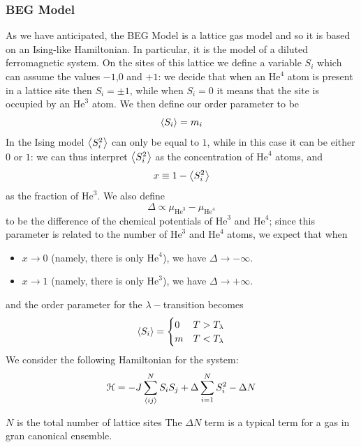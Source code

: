 \documentclass[../../Main/Main.tex]{subfiles}
\begin{document}
\subsubsection{BEG Model}
As we have anticipated, the BEG Model is a lattice gas model and so it is based on an Ising-like Hamiltonian. In particular, it is the model of a diluted ferromagnetic system.
On the sites of this lattice we define a variable \(S_i\) which can assume the values \(-1\),\(0\) and \(+1\): we decide that when an \( \text{He}^4 \) atom is present in a lattice site then  \(S_{i}=\pm 1\), while when \(S_{i}= 0\) it means that the site is occupied by an \( \text{He}^3 \) atom.
We then define our order parameter to be
\begin{equation*}
     \expval{S_i} = m_i 
\end{equation*}
In the Ising model  \( \expval{S_i^2}  \) can only be equal to \(1\), while in this case it can be either \(0\) or \(1\): we can thus interpret \( \expval{S_i^2}  \) as the concentration of \( \text{He}^4 \) atoms, and
\begin{equation*}
  x \equiv 1 - \expval{S_i^2}
\end{equation*}
 as the fraction of \( \text{He}^3 \).
 We also define 
\begin{equation*}
  \Delta \propto \mu _{\text{He}^3} - \mu _{\text{He}^4}
\end{equation*}
to be the difference of the chemical potentials of \( \text{He}^3 \) and \( \text{He}^4 \); since this parameter is related to the number of \( \text{He}^3 \) and \( \text{He}^4 \) atoms, we expect that when
\begin{itemize}
\item \( x \rightarrow 0\)  (namely, there is only \( \text{He}^4 \)), we have \( \Delta \rightarrow - \infty  \).
\item \( x \rightarrow 1\)  (namely, there is only \( \text{He}^3 \)), we have \( \Delta \rightarrow + \infty  \).
\end{itemize}
and the order parameter for the \( \lambda - \)transition becomes
\begin{equation*}
\expval{S_i} =
  \begin{cases}
   0 & T > T_{\lambda }\\
   m & T < T_{\lambda }
  \end{cases}
\end{equation*}
We consider the following Hamiltonian for the system:
\begin{equation}
\mathcal{H} = - J \sum_{\expval{ij} }^{N} S_i S_j + \Delta \sum_{i=1}^{N} S_i^2 - \Delta N
\end{equation}
\begin{remark}
\(N\) is the total number of lattice sites
The \( \Delta N \) term is a typical term for a gas in gran canonical ensemble.  
\end{remark}
\end{document}
